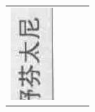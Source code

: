 \documentclass[10pt]{article}
\begin{document}
\begin{center}
\begin{tabular}{|c|c|c|c|}
\includegraphics[max width=\textwidth]{2024_07_05_645bb794a4d4f32ee0c8g-332(2)}

\end{tabular}
\end{center}
\end{document}
